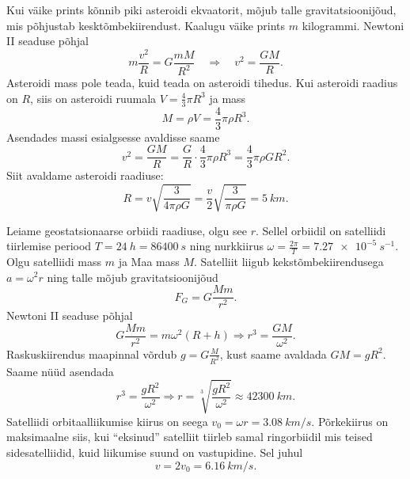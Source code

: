 \documentclass[10pt, twoside]{article}
\begin{document}
{%

\solu
Kui väike prints kõnnib piki asteroidi ekvaatorit, mõjub talle gravitatsioonijõud,
mis põhjustab kesktõmbekiirendust. Kaalugu väike prints $m$ kilogrammi. Newtoni
II seaduse põhjal
\[
m \frac{v^{2}}{R}=G \frac{m M}{R^{2}} \quad \Rightarrow \quad v^{2}=\frac{G M}{R}.
\]
Asteroidi mass pole teada, kuid teada on asteroidi tihedus. Kui asteroidi raadius on $R$, siis on asteroidi ruumala $V=\frac{4}{3} \pi R^{3}$ ja mass
\[
M=\rho V=\frac{4}{3} \pi \rho R^{3}.
\]
Asendades massi esialgsesse avaldisse saame
\[
v^{2}=\frac{G M}{R}=\frac{G}{R} \cdot \frac{4}{3} \pi \rho R^{3}=\frac{4}{3} \pi \rho G R^{2}.
\]
Siit avaldame asteroidi raadiuse:
\[
R=v \sqrt{\frac{3}{4 \pi \rho G}}=\frac{v}{2} \sqrt{\frac{3}{\pi \rho G}}=\SI{5}{km}.
\]
\probend
\bigskip


\solu
Leiame geostatsionaarse orbiidi raadiuse, olgu see $r$. Sellel orbiidil on satelliidi tiirlemise periood $T = \SI{24}{h} = \SI{86400}{s}$ ning nurkkiirus $\omega=\frac{2 \pi}{T}=\SI{7,27e-5}{s^{-1}}$. Olgu satelliidi mass $m$ ja Maa mass $M$. Satelliit liigub kekstõmbekiirendusega $a = \omega^2 r$ ning talle mõjub gravitatsioonijõud
\[
F_{G}=G \frac{M m}{r^{2}}.
\]
Newtoni II seaduse põhjal
\[
G \frac{M m}{r^{2}}=m \omega^{2}(R+h) \Rightarrow r^{3}=\frac{G M}{\omega^{2}}.
\]
Raskuskiirendus maapinnal võrdub $g=G \frac{M}{R^{2}}$, kust saame avaldada $GM = gR^2$.
Saame nüüd asendada 
\[
r^{3}=\frac{g R^{2}}{\omega^{2}} \Rightarrow r=\sqrt[3]{\frac{g R^{2}}{\omega^{2}}} \approx \SI{42300}{km}.
\]
Satelliidi orbitaalliikumise kiirus on seega $v_0 = \omega r = \SI{3,08}{km/s}$. Põrkekiirus on maksimaalne siis, kui \enquote{eksinud} satelliit tiirleb samal ringorbiidil mis teised sidesatelliidid, kuid liikumise suund on vastupidine. Sel juhul
\[
v=2 v_{0}=\SI{6,16}{km/s}.
\]
\probend
\bigskip


}
\end{document}
